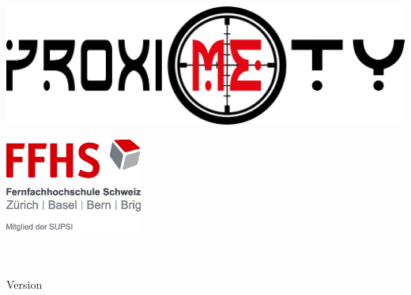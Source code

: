 \begin{titlepage}
\hspace{\fill}
\vspace{30mm}
\begin{center}
\Huge{\textbf{\titel}}\\[4ex]
\LARGE{\untertitel}\\[6ex]
\includegraphics[scale=0.2]{../02_Images/proximety.png}\\
\end{center}
\vspace{20mm}
\begin{flushright}
\includegraphics[scale=1]{bilder/allgemein/logo.png}\\[2ex]
\begin{Large}
\autor\\
\comment\\
Version \version\\
\datum\\
\end{Large}
\end{flushright}
\end{titlepage}
\restoregeometry %
\newpage